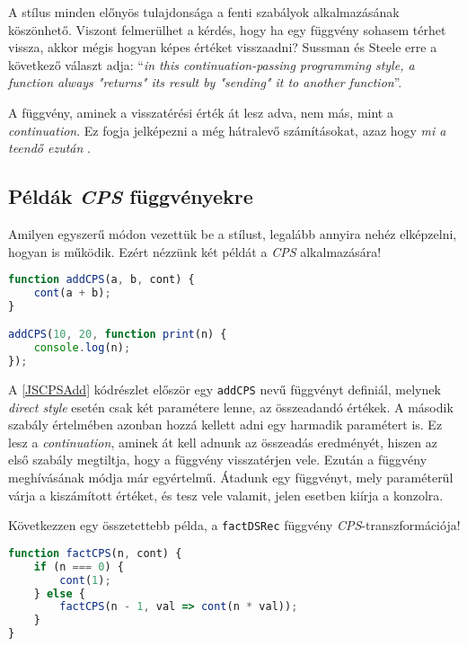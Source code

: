 A stílus minden előnyös tulajdonsága a fenti szabályok alkalmazásának köszönhető. Viszont felmerülhet a kérdés, hogy ha egy függvény sohasem térhet vissza, akkor mégis hogyan képes értéket visszaadni? Sussman és Steele \citeyear{Sussman1975} erre a következő választ adja: ``\textit{\textellipsis in this continuation-passing programming style, a function always "returns" its result by "sending" it to another function}''. 

A függvény, aminek a visszatérési érték át lesz adva, nem más, mint a \textit{continuation}. Ez fogja jelképezni a még hátralevő számításokat, azaz hogy \textit{mi a teendő ezután} \cite{CompCont}.

\subsection{Példák \textit{CPS} függvényekre}

Amilyen egyszerű módon vezettük be a stílust, legalább annyira nehéz elképzelni, hogyan is működik. Ezért nézzünk két példát a \textit{CPS} alkalmazására!

\begin{lstlisting}[language=JavaScript, caption={\textit{CPS} összeadást végző függvény és meghívása}, captionpos=b, label=JSCPSAdd]
function addCPS(a, b, cont) {
    cont(a + b);
}

addCPS(10, 20, function print(n) {
    console.log(n);
});
\end{lstlisting}

A \ref{JSCPSAdd} kódrészlet először egy \texttt{addCPS} nevű függvényt definiál, melynek \textit{direct style} esetén csak két paramétere lenne, az összeadandó értékek. A második szabály értelmében azonban hozzá kellett adni egy harmadik paramétert is. Ez lesz a \textit{continuation}, aminek át kell adnunk az összeadás eredményét, hiszen az első szabály megtiltja, hogy a függvény visszatérjen vele. Ezután a függvény meghívásának módja már egyértelmű. Átadunk egy függvényt, mely paraméterül várja a kiszámított értéket, és tesz vele valamit, jelen esetben kiírja a konzolra.

Következzen egy összetettebb példa, a \texttt{factDSRec} függvény \textit{CPS}-transzformációja!

\begin{lstlisting}[language=JavaScript, caption={\textit{CPS} faktoriálist kiszámító függvény}, captionpos=b, label=JSCPSFact]
function factCPS(n, cont) {
    if (n === 0) {
        cont(1);
    } else {
        factCPS(n - 1, val => cont(n * val));
    }
}
\end{lstlisting}

